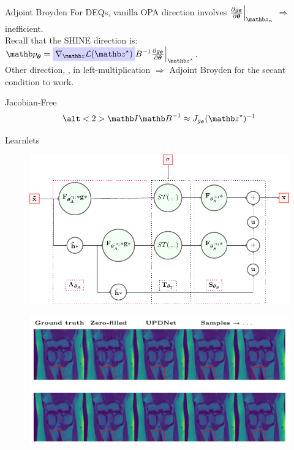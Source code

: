 \begin{frame}{Adjoint Broyden}
    For DEQs, vanilla OPA direction involves $\frac{\partial g_{\thetab}}{\partial \thetab}\Bigr|_{\zb_n}$ $\Rightarrow$ inefficient.\\

    Recall that the SHINE direction is: $\pb_\thetab =  \highlight{blue}{$\nabla_\zb \mathcal{L}(\zb^\star)$} B^{-1} \frac{\partial g_{\thetab}}{\partial \thetab}\Bigr|_{\zb^\star}$.\\
    Other direction, , in left-multiplication $\Rightarrow$ Adjoint Broyden for the secant condition to work.
\end{frame}

\begin{frame}{Jacobian-Free}
    \begin{equation*}
        \alt<2>{\Ib}{\Bb^{-1}} \approx J_{g_{\thetab}}(\zb^\star)^{-1}
    \end{equation*}
\end{frame}

\begin{frame}{Learnlets}
    \begin{figure}
        \centering
        \includegraphics[height=0.8\textheight]{Figures/clinic_applic/learnlets_tikz_reduced.pdf}
    \end{figure}
\end{frame}

\begin{frame}
    \begin{figure}
        \centering
        \includegraphics[width=\textwidth]{Figures/clinic_applic/dsm_main.pdf}
    \end{figure}
\end{frame}

